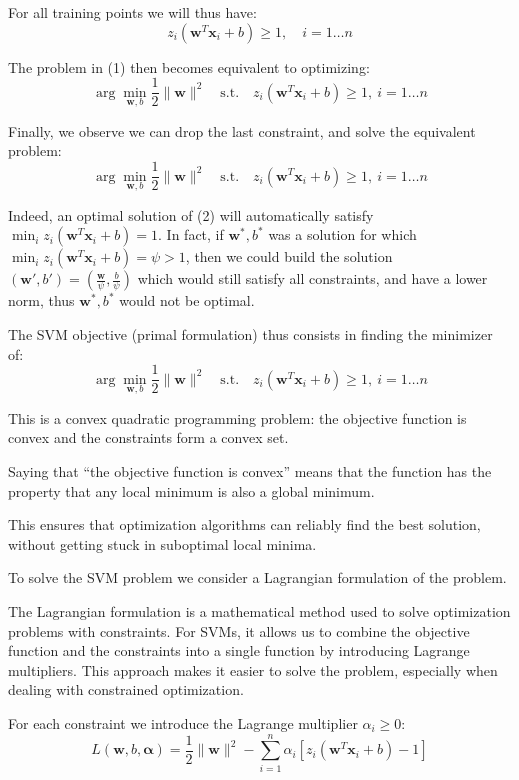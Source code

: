 For all training points we will thus have:
\[
z_i(\mathbf{w}^T \mathbf{x}_i + b) \geq 1, \quad i = 1\ldots n
\]

The problem in (1) then becomes equivalent to optimizing:
\[
\arg\min_{\mathbf{w},b} \frac{1}{2}\|\mathbf{w}\|^2 \quad \text{s.t.} \quad z_i(\mathbf{w}^T \mathbf{x}_i + b) \geq 1,\ i = 1\ldots n
\]

Finally, we observe we can drop the last constraint, and solve the equivalent problem:
\[
\arg\min_{\mathbf{w},b} \frac{1}{2}\|\mathbf{w}\|^2 \quad \text{s.t.} \quad z_i(\mathbf{w}^T \mathbf{x}_i + b) \geq 1,\ i = 1\ldots n \tag{2}
\]

Indeed, an optimal solution of (2) will automatically satisfy $\min_i z_i(\mathbf{w}^T \mathbf{x}_i + b) = 1$. In fact, if
$\mathbf{w}^*, b^*$ was a solution for which $\min_i z_i(\mathbf{w}^T \mathbf{x}_i + b) = \psi > 1$, then we could build the
solution $(\mathbf{w}', b') = \left(\frac{\mathbf{w}}{\psi}, \frac{b}{\psi}\right)$ which would still satisfy all constraints, and have a lower
norm, thus $\mathbf{w}^*, b^*$ would not be optimal.

The SVM objective (primal formulation) thus consists in finding the minimizer of:
\[
\arg\min_{\mathbf{w},b} \frac{1}{2}\|\mathbf{w}\|^2 \quad \text{s.t.} \quad z_i(\mathbf{w}^T \mathbf{x}_i + b) \geq 1,\ i = 1\ldots n
\]

This is a convex quadratic programming problem: the objective function is convex and the
constraints form a convex set.

Saying that ``the objective function is convex'' means that the function has the property that any
local minimum is also a global minimum.

This ensures that optimization algorithms can reliably find the best solution, without getting stuck in
suboptimal local minima.

To solve the SVM problem we consider a Lagrangian formulation of the problem.

The Lagrangian formulation is a mathematical method used to solve optimization problems with
constraints. For SVMs, it allows us to combine the objective function and the constraints into a
single function by introducing Lagrange multipliers. This approach makes it easier to solve the
problem, especially when dealing with constrained optimization.

For each constraint we introduce the Lagrange multiplier $\alpha_i \geq 0$:
\[
L(\mathbf{w}, b, \boldsymbol{\alpha}) = \frac{1}{2}\|\mathbf{w}\|^2 - \sum_{i=1}^n \alpha_i \left[ z_i \left( \mathbf{w}^T \mathbf{x}_i + b \right) - 1 \right]
\]

